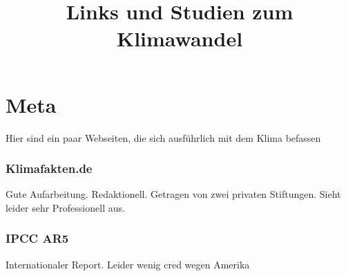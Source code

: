 \documentclass{article}
\title{Links und Studien zum Klimawandel}
\begin{document}
\section{Meta}
Hier sind ein paar Webseiten, die sich ausführlich mit dem Klima befassen

\subsubsection{Klimafakten.de}
Gute Aufarbeitung. Redaktionell. Getragen von zwei privaten Stiftungen.
Sieht leider sehr Professionell aus.\cite{klima_meta_1}

\subsubsection{IPCC AR5}
Internationaler Report. Leider wenig cred wegen Amerika\cite{klima_meta_2}

\end{document}
